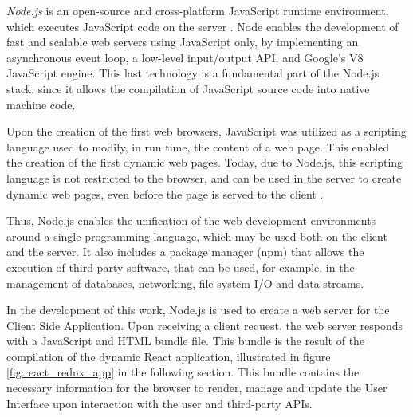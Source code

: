 \textit{Node.js} \cite{nodejs} is an open-source and cross-platform JavaScript runtime environment, which executes JavaScript code on the server \cite{node_article}. Node enables the development of fast and scalable web servers using JavaScript only, by implementing an asynchronous event loop, a low-level input/output API, and Google's V8 JavaScript engine. This last technology is a fundamental part of the Node.js stack, since it allows the compilation of JavaScript source code into native machine code. 

Upon the creation of the first web browsers, JavaScript was utilized as a scripting language used to modify, in run time, the content of a web page. This enabled the creation of the first dynamic web pages. Today, due to Node.js, this scripting language is not restricted to the browser, and can be used in the server to create dynamic web pages, even before the page is served to the client \cite{node_book}. 

Thus, Node.js enables the unification of the web development environments around a single programming language, which may be used both on the client and the server. It also includes a package manager (npm) that allows the execution of third-party software, that can be used, for example, in the management of databases, networking, file system I/O and data streams.

In the development of this work, Node.js is used to create a web server for the Client Side Application. Upon receiving a client request, the web server responds with a JavaScript and HTML bundle file. This bundle is the result of the compilation of the dynamic React application, illustrated in figure \ref{fig:react_redux_app} in the following section. This bundle contains the necessary information for the browser to render, manage and update the User Interface upon interaction with the user and third-party APIs.